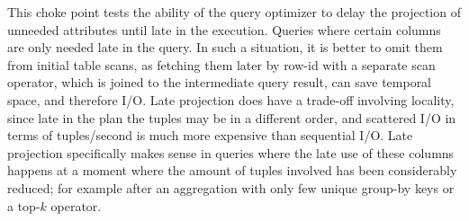 
This choke point tests the ability of the query optimizer to delay the
projection of unneeded attributes until late in the execution. Queries where
certain columns are only needed late in the query. In such a situation, it is
better to omit them from initial table scans, as fetching them later by row-id
with a separate scan operator, which is joined to the intermediate query result,
can save temporal space, and therefore I/O. Late projection does have a
trade-off involving locality, since late in the plan the tuples may be in a
different order, and scattered I/O in terms of tuples/second is much more
expensive than sequential I/O. Late projection specifically makes sense in
queries where the late use of these columns happens at a moment where the amount
of tuples involved has been considerably reduced; for example after an
aggregation with only few unique group-by keys or a top-$k$ operator.


